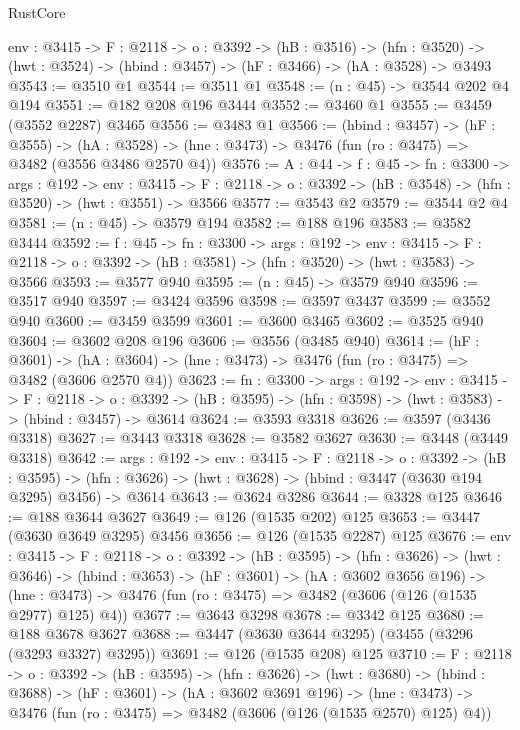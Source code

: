 \begin{lexlean}{RustCore}
\begin{coremodule}
  {env : @3415} ->
  {F : @2118} ->
  {o : @3392} ->
  (hB : @3516) ->
  (hfn : @3520) -> (hwt : @3524) -> (hbind : @3457) -> (hF : @3466) -> (hA : @3528) -> @3493
@3543 := @3510 @1
@3544 := @3511 @1
@3548 := (n : @45) -> @3544 @202 @4 @194
@3551 := @182 @208 @196 @3444
@3552 := @3460 @1
@3555 := @3459 (@3552 @2287) @3465
@3556 := @3483 @1
@3566 := (hbind : @3457) ->
  (hF : @3555) ->
  (hA : @3528) -> (hne : @3473) -> @3476 (fun (ro : @3475) => @3482 (@3556 @3486 @2570 @4))
@3576 := {A : @44} ->
  {f : @45} ->
  {fn : @3300} ->
  {args : @192} ->
  {env : @3415} ->
  {F : @2118} -> {o : @3392} -> (hB : @3548) -> (hfn : @3520) -> (hwt : @3551) -> @3566
@3577 := @3543 @2
@3579 := @3544 @2 @4
@3581 := (n : @45) -> @3579 @194
@3582 := @188 @196
@3583 := @3582 @3444
@3592 := {f : @45} ->
  {fn : @3300} ->
  {args : @192} ->
  {env : @3415} ->
  {F : @2118} -> {o : @3392} -> (hB : @3581) -> (hfn : @3520) -> (hwt : @3583) -> @3566
@3593 := @3577 @940
@3595 := (n : @45) -> @3579 @940
@3596 := @3517 @940
@3597 := @3424 @3596
@3598 := @3597 @3437
@3599 := @3552 @940
@3600 := @3459 @3599
@3601 := @3600 @3465
@3602 := @3525 @940
@3604 := @3602 @208 @196
@3606 := @3556 (@3485 @940)
@3614 := (hF : @3601) ->
  (hA : @3604) -> (hne : @3473) -> @3476 (fun (ro : @3475) => @3482 (@3606 @2570 @4))
@3623 := {fn : @3300} ->
  {args : @192} ->
  {env : @3415} ->
  {F : @2118} ->
  {o : @3392} -> (hB : @3595) -> (hfn : @3598) -> (hwt : @3583) -> (hbind : @3457) -> @3614
@3624 := @3593 @3318
@3626 := @3597 (@3436 @3318)
@3627 := @3443 @3318
@3628 := @3582 @3627
@3630 := @3448 (@3449 @3318)
@3642 := {args : @192} ->
  {env : @3415} ->
  {F : @2118} ->
  {o : @3392} ->
  (hB : @3595) ->
  (hfn : @3626) -> (hwt : @3628) -> (hbind : @3447 (@3630 @194 @3295) @3456) -> @3614
@3643 := @3624 @3286
@3644 := @3328 @125
@3646 := @188 @3644 @3627
@3649 := @126 (@1535 @202) @125
@3653 := @3447 (@3630 @3649 @3295) @3456
@3656 := @126 (@1535 @2287) @125
@3676 := {env : @3415} ->
  {F : @2118} ->
  {o : @3392} ->
  (hB : @3595) ->
  (hfn : @3626) ->
  (hwt : @3646) ->
  (hbind : @3653) ->
  (hF : @3601) ->
  (hA : @3602 @3656 @196) ->
  (hne : @3473) -> @3476 (fun (ro : @3475) => @3482 (@3606 (@126 (@1535 @2977) @125) @4))
@3677 := @3643 @3298
@3678 := @3342 @125
@3680 := @188 @3678 @3627
@3688 := @3447 (@3630 @3644 @3295) (@3455 (@3296 (@3293 @3327) @3295))
@3691 := @126 (@1535 @208) @125
@3710 := {F : @2118} ->
  {o : @3392} ->
  (hB : @3595) ->
  (hfn : @3626) ->
  (hwt : @3680) ->
  (hbind : @3688) ->
  (hF : @3601) ->
  (hA : @3602 @3691 @196) ->
  (hne : @3473) -> @3476 (fun (ro : @3475) => @3482 (@3606 (@126 (@1535 @2570) @125) @4))

\end{coremodule}
\end{lexlean}
